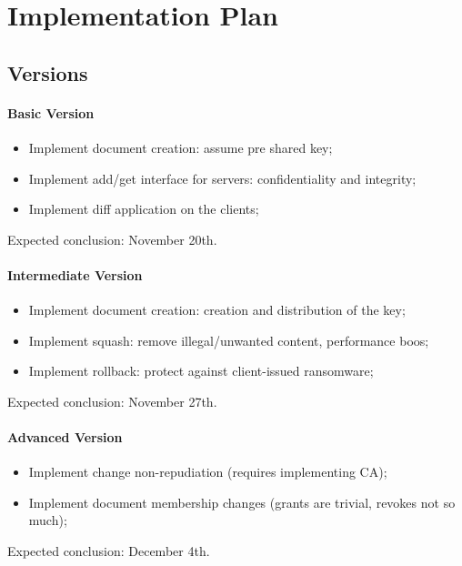 \section{Implementation Plan}

\subsection{Versions}

\paragraph{Basic Version} {
    \begin{itemize}
        \setlength{\itemsep}{0pt}
        \setlength{\parskip}{0pt}
        \setlength{\parsep}{0pt}
        \item Implement document creation: assume pre shared key;
        \item Implement add/get interface for servers: confidentiality and integrity;
        \item Implement diff application on the clients;
    \end{itemize}
    Expected conclusion: November 20th.
}

\paragraph{Intermediate Version} {
    \begin{itemize}
        \setlength{\itemsep}{0pt}
        \setlength{\parskip}{0pt}
        \setlength{\parsep}{0pt}
        \item Implement document creation: creation and distribution of the key;
        \item Implement squash: remove illegal/unwanted content, performance boos;
        \item Implement rollback: protect against client-issued ransomware;
    \end{itemize}
    Expected conclusion: November 27th.
}

\paragraph{Advanced Version} {
    \begin{itemize}
        \setlength{\itemsep}{0pt}
        \setlength{\parskip}{0pt}
        \setlength{\parsep}{0pt}
	\item Implement change non-repudiation (requires implementing CA);
	\item Implement document membership changes (grants are trivial, revokes not so much);
    \end{itemize}
    Expected conclusion: December 4th.
}

